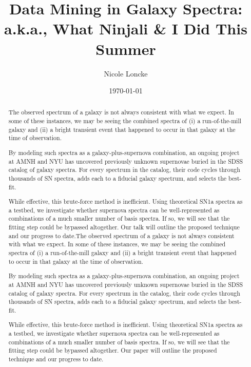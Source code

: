 \documentclass{article}
\title{Data Mining in Galaxy Spectra: \\ a.k.a., What Ninjali \& I Did This Summer}
\author{Nicole Loncke}
\date{\today}
\begin{document}
\maketitle

\tableofcontents

\begin{abstract}
The observed spectrum of a galaxy is not always consistent with what
we expect.  In some of these instances, we may be seeing the combined
spectra of (i) a run-of-the-mill galaxy and (ii) a bright transient
event that happened to occur in that galaxy at the time of
observation.

By modeling such spectra as a galaxy-plus-supernova combination, an
ongoing project at AMNH and NYU has uncovered previously unknown
supernovae buried in the SDSS catalog of galaxy spectra.  For every
spectrum in the catalog, their code cycles through thousands of SN
spectra, adds each to a fiducial galaxy spectrum, and selects the
best-fit.

While effective, this brute-force method is inefficient. Using
theoretical SN1a spectra as a testbed, we investigate whether
supernova spectra can be well-represented as combinations of a much
smaller number of basis spectra.  If so, we will see that the fitting
step could be bypassed altogether.  Our talk will outline the proposed
technique and our progress to date.The observed spectrum of a galaxy
is not always consistent with what we expect.  In some of these
instances, we may be seeing the combined spectra of (i) a
run-of-the-mill galaxy and (ii) a bright transient event that happened
to occur in that galaxy at the time of observation.

By modeling such spectra as a galaxy-plus-supernova combination, an
ongoing project at AMNH and NYU has uncovered previously unknown
supernovae buried in the SDSS catalog of galaxy spectra.  For every
spectrum in the catalog, their code cycles through thousands of SN
spectra, adds each to a fiducial galaxy spectrum, and selects the
best-fit.

While effective, this brute-force method is inefficient. Using
theoretical SN1a spectra as a testbed, we investigate whether
supernova spectra can be well-represented as combinations of a much
smaller number of basis spectra.  If so, we will see that the fitting
step could be bypassed altogether.  Our paper will outline the
proposed technique and our progress to date.
  
\end{abstract}
\end{document}
